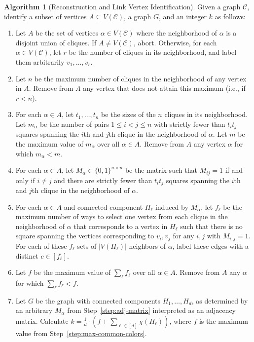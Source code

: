 \documentclass{amsart}
\theoremstyle{hypothesisstyle}
\newcommand{\set}[1]{\{#1\}}
\theoremstyle{definition}
\newtheorem{algorithm}[alg]{Algorithm}
\theoremstyle{remark}
\numberwithin{equation}{section}
\newcommand{\abs}[1]{\lvert#1\rvert}
\newcommand{\C}{\mathcal C}
\begin{document}
\begin{algorithm}[Reconstruction and Link Vertex Identification]\label{algo:link-vertex} 
    Given a graph $\C$, identify a subset of vertices $A\subseteq V(\C)$, a graph $G$, and an integer $k$ as follows:
\begin{enumerate}
    \item\label{step:clique-neighborhood} Let $A$ be the set of vertices $\alpha\in V(\C)$ where the neighborhood of $\alpha$ is a disjoint union of cliques. If $A\ne V(\mathcal C)$, abort. Otherwise, for each $\alpha\in V(\mathcal C)$, let $r$ be the number of cliques in its neighborhood, and label them arbitrarily $v_1, \dots, v_r$.
    \item\label{step:all-vertices-free} Let $n$ be the maximum number of cliques in the neighborhood of any vertex in $A$. Remove from $A$ any vertex that does not attain this maximum (i.e., if $r<n$).
    \item\label{step:all-edges-have-common-color} For each $\alpha\in A$, let $t_1,\dots,t_n$ be the sizes of the $n$ cliques in its neighborhood. Let $m_\alpha$ be the number of pairs $1\le i<j\le n$ with strictly fewer than $t_it_j$ squares spanning the $i$th and $j$th clique in the neighborhood of $\alpha$. Let $m$ be the maximum value of $m_\alpha$ over all $\alpha\in A$. Remove from $A$ any vertex $\alpha$ for which $m_{\alpha}<m$.
    \item\label{step:adj-matrix} For each $\alpha\in A$, let $M_\alpha\in \set{0,1}^{n\times n}$ be the matrix such that $M_{ij}=1$ if and only if $i\ne j$ and there are strictly fewer than $t_it_j$ squares spanning the $i$th and $j$th clique in the neighborhood of $\alpha$.
    \item\label{step:find-common-colors} For each $\alpha\in A$ and connected component $H_\ell$ induced by $M_\alpha$, let $f_\ell$ be the maximum number of ways to select one vertex from each clique in the neighborhood of $\alpha$ that corresponds to a vertex in $H_\ell$ such that there is no square spanning the vertices corresponding to $v_i,v_j$ for any $i,j$ with $M_{i,j}=1$. For each of these $f_\ell$ sets of $\abs{V(H_\ell)}$ neighbors of $\alpha$, label these edges with a distinct $c\in[f_\ell]$. 
    \item\label{step:max-common-colors} Let $f$ be the maximum value of $\sum_\ell f_\ell$ over all $\alpha\in A$. Remove from $A$ any $\alpha$ for which $\sum_\ell f_\ell < f$.
    \item\label{step:formula-for-k} Let $G$ be the graph with connected components $H_1,\dots,H_d$, as determined by an arbitrary $M_{\alpha}$ from Step~\ref{step:adj-matrix} interpreted as an adjacency matrix. Calculate $k=\frac 1 d \cdot \left(f+\sum_{\ell\in[d]}\chi(H_\ell)\right)$, where $f$ is the maximum value from Step~\ref{step:max-common-colors}. %

\end{enumerate}
\end{algorithm}
\end{document}
